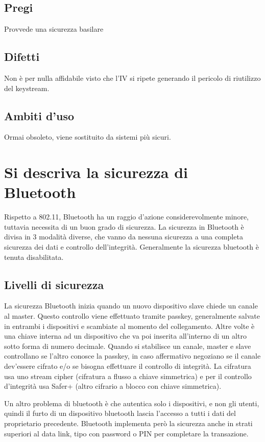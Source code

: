 \subsection{Pregi}
Provvede una sicurezza basilare
\subsection{Difetti}
Non è per nulla affidabile visto che l'IV si ripete generando il pericolo di riutilizzo del keystream.
\subsection{Ambiti d'uso}
Ormai obsoleto, viene sostituito da sistemi più sicuri.

\section{Si descriva la sicurezza di Bluetooth}

Rispetto a 802.11, Bluetooth ha un raggio d’azione considerevolmente minore, tuttavia necessita di un buon grado di sicurezza.
La sicurezza in Bluetooth è divisa in 3 modalità diverse, che vanno da nessuna sicurezza a una completa sicurezza dei dati e controllo dell’integrità.
Generalmente la sicurezza bluetooth è tenuta disabilitata.
\subsection{Livelli di sicurezza}
La sicurezza Bluetooth inizia quando un nuovo dispositivo slave chiede un canale al master.
Questo controllo viene effettuato tramite passkey, generalmente salvate in entrambi i dispositivi e scambiate al momento del collegamento. Altre volte è una chiave interna ad un dispositivo che va poi inserita all’interno di un altro sotto forma di numero decimale.
Quando si stabilisce un canale, master e slave controllano se l’altro conosce la passkey, in caso affermativo negoziano se il canale dev’essere cifrato e/o se bisogna effettuare il controllo di integrità.
La cifratura usa uno stream cipher (cifratura a flusso a chiave simmetrica) e per il controllo d’integrità usa Safer+ (altro cifrario a blocco con chiave simmetrica).

Un altro problema di bluetooth è che autentica solo i dispositivi, e non gli utenti, quindi il furto di un dispositivo bluetooth lascia l’accesso a tutti i dati del proprietario precedente.
Bluetooth implementa però la sicurezza anche in strati superiori al data link, tipo con password o PIN per completare la transazione.

